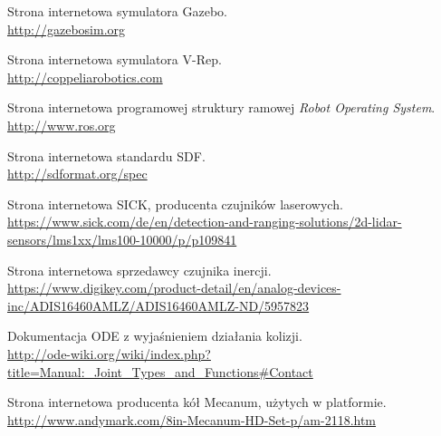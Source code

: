 \begin{thebibliography}{0}
Strona internetowa symulatora Gazebo. \\
\url{http://gazebosim.org}

Strona internetowa symulatora V-Rep. \\
\url{http://coppeliarobotics.com}

Strona internetowa programowej struktury ramowej \emph{Robot Operating System}. \\
\url{http://www.ros.org}

Strona internetowa standardu SDF. \\
\url{http://sdformat.org/spec}

Strona internetowa SICK, producenta czujników laserowych. \\
\url{https://www.sick.com/de/en/detection-and-ranging-solutions/2d-lidar-sensors/lms1xx/lms100-10000/p/p109841}

Strona internetowa sprzedawcy czujnika inercji. \\
\url{https://www.digikey.com/product-detail/en/analog-devices-inc/ADIS16460AMLZ/ADIS16460AMLZ-ND/5957823}

Dokumentacja ODE z wyjaśnieniem działania kolizji. \\
\url{http://ode-wiki.org/wiki/index.php?title=Manual:_Joint_Types_and_Functions#Contact}

Strona internetowa producenta kół Mecanum, użytych w platformie. \\
\url{http://www.andymark.com/8in-Mecanum-HD-Set-p/am-2118.htm}

\end{thebibliography}
